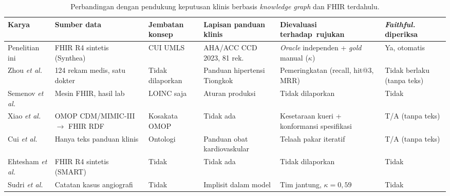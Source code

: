 \begin{table}[h]
\centering
\caption{Perbandingan dengan pendukung keputusan klinis berbasis \emph{knowledge graph} dan
FHIR terdahulu.}
\label{tab:prior-systems}
\footnotesize
\setlength{\tabcolsep}{3pt}
\begin{tabular}{p{22mm}p{20mm}p{18mm}p{18mm}p{24mm}p{16mm}}
\hline
\textbf{Karya} & \textbf{Sumber data} & \textbf{Jembatan konsep} & \textbf{Lapisan panduan klinis}
& \textbf{Dievaluasi terhadap\ rujukan} & \textbf{\emph{Faithful.} diperiksa} \\
\hline
Penelitian ini
  & FHIR R4 sintetis (Synthea)
  & CUI UMLS
  & AHA/ACC CCD 2023, 81 rek.
  & \emph{Oracle} independen + \emph{gold} manual ($\kappa$)
  & Ya, otomatis \\
Zhou \textit{et al.} \cite{zhou2022}
  & 124 rekam medis, satu dokter
  & Tidak dilaporkan
  & Panduan hipertensi Tiongkok
  & Pemeringkatan (recall, hit@3, MRR)
  & Tidak berlaku (tanpa teks) \\
Semenov \textit{et al.} \cite{semenov2018}
  & Mesin FHIR, hasil lab
  & LOINC saja
  & Aturan produksi
  & Tidak dilaporkan
  & Tidak \\
Xiao \textit{et al.} \cite{xiao2022}
  & OMOP CDM/MIMIC-III $\rightarrow$ FHIR RDF
  & Kosakata OMOP
  & Tidak ada
  & Kesetaraan kueri + konformansi spesifikasi
  & T/A (tanpa teks) \\
Cui \textit{et al.} \cite{cui2025}
  & Hanya teks panduan klinis
  & Ontologi
  & Panduan obat kardiovaskular
  & Telaah pakar iteratif
  & T/A (tanpa teks) \\
Ehtesham \textit{et al.} \cite{ehtesham2025}
  & FHIR R4 sintetis (SMART)
  & Tidak
  & Tidak ada
  & Tidak dilaporkan
  & Tidak \\
Sudri \textit{et al.} \cite{sudri2024}
  & Catatan kasus angiografi
  & Tidak
  & Implisit dalam model
  & Tim jantung, $\kappa = 0{,}59$
  & Tidak \\
\hline
\end{tabular}

\vspace{2pt}
\end{table}

